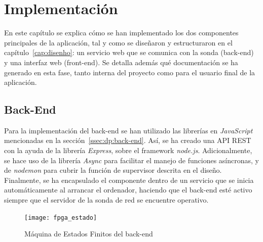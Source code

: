\chapter{Implementación\label{cap:implementacion}}

En este capítulo se explica cómo se han implementado los dos componentes principales de la aplicación, tal y como se diseñaron y estructuraron en el capítulo~\ref{cap:disenho}: un servicio web que se comunica con la sonda (\gls{back-end}) y una interfaz web (\gls{front-end}).
Se detalla además qué documentación se ha generado en esta fase, tanto interna del proyecto como para el usuario final de la aplicación.

\section{Back-End\label{sec:imp:back_end}}

Para la implementación del \gls{back-end} se han utilizado las librerías en \textit{JavaScript} mencionadas en la sección~\ref{ssec:dp:back-end}.
Así, se ha creado una \gls{API} \gls{REST} con la ayuda de la librería \textit{Express}, sobre el \gls{framework} \textit{node.js}.
Adicionalmente, se hace uso de la librería \textit{Async} para facilitar el manejo de funciones asíncronas, y de \textit{nodemon} para cubrir la función de supervisor descrita en el diseño.
Finalmente, se ha encapsulado el componente dentro de un servicio que se inicia automáticamente al arrancar el ordenador, haciendo que el \gls{back-end} esté activo siempre que el servidor de la sonda de red se encuentre operativo.

\begin{figure}[!htp]
  \centering
  \texttt{[image: fpga\_estado]}
  \caption{Máquina de Estados Finitos del \gls{back-end}}
  \label{fig:fpga_estado}
\end{figure}

